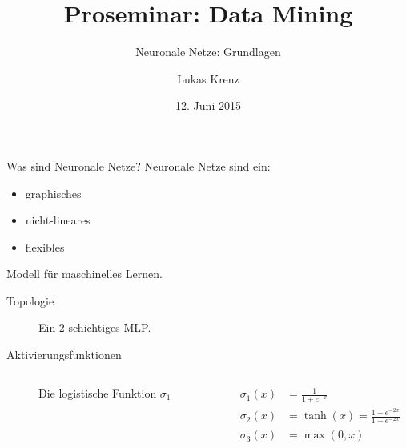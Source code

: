 \documentclass[10pt, compress, xetex]{beamer}
\title{Proseminar: Data Mining}
\subtitle{Neuronale Netze: Grundlagen}
\author{Lukas Krenz}
\date{12. Juni 2015}
\institute{Technische Universität München}
\begin{document}
\begin{frame}
\titlepage
\end{frame}


\begin{frame}{Was sind Neuronale Netze?}
Neuronale Netze sind ein:
\begin{itemize}
\item graphisches
\item nicht-lineares
\item flexibles
\end{itemize}
Modell für maschinelles Lernen.
\end{frame}

\begin{frame}{Topologie}
\begin{figure}[ht!]
\label{fig:MLP}
  \centering
    
  \caption{Ein 2-schichtiges MLP.}
\end{figure}

\end{frame}


\begin{frame}{Aktivierungsfunktionen}
\begin{columns}[c]
  \begin{column}[c]{.6\textwidth}
  \begin{figure}[ht!]
  \centering
  \caption{Die logistische Funktion $\sigma_1$}
\end{figure}
  \end{column}  
  \begin{column}[c]{.5\textwidth}
    \begin{align}
      \sigma_1(x) & =  \frac{1}{1+e^{-x}} \\
      \sigma_2(x) & =  \tanh(x) = \frac{1-e^{-2x}}{1+e^{-2x}} \\
      \sigma_3(x) & =  \max(0,x)
    \end{align}
    \end{column}
\end{columns} 

\end{frame}
\end{document}
